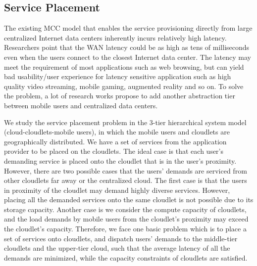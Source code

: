 

\subsection{Service Placement}

The existing MCC model that enables the service provisioning directly from large centralized Internet data centers inherently incurs relatively high latency. Researchers point that the WAN latency could be as high as tens of milliseconds even when the users connect to the closest Internet data center. The latency may meet the requirement of most applications such as web browsing, but can yield bad usability/user experience for latency sensitive application such as high quality video streaming, mobile gaming, augmented reality and so on. To solve the problem, a lot of research works propose to add another abstraction tier between mobile users and centralized data centers.

We study the service placement problem in the 3-tier hierarchical system model (cloud-cloudlets-mobile users), in which the mobile users and cloudlets are geographically distributed. We have a set of services from the application provider to be placed on the cloudlets. The ideal case is that each user's demanding service is placed onto the cloudlet that is in the user's proximity. However, there are two possible cases that the users' demands are serviced from other cloudlets far away or the centralized cloud. The first case is that the users in proximity of the cloudlet may demand highly diverse services. However, placing all the demanded services onto the same cloudlet is not possible due to its storage capacity. Another case is we consider the compute capacity of cloudlets, and the load demands by mobile users from the cloudlet's proximity may exceed the cloudlet's capacity. Therefore, we face one basic problem which is to place a set of services onto cloudlets, and dispatch users' demands to the middle-tier cloudlets and the upper-tier cloud, such that the average latency of all the demands are minimized, while the capacity constraints of cloudlets are satisfied.

